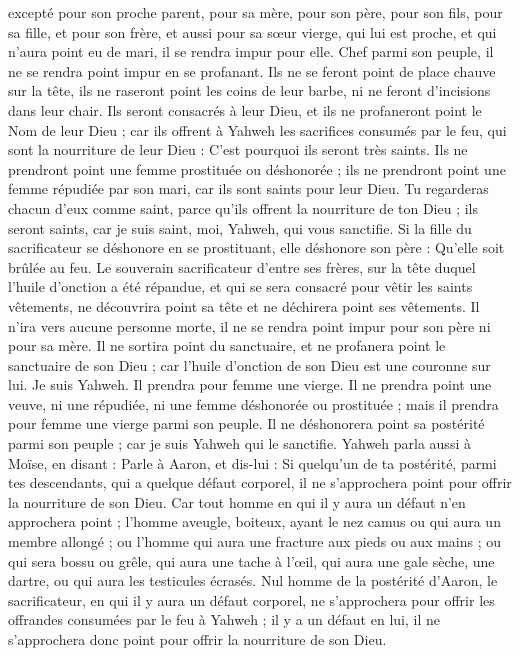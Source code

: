 \begin{multicols}{2}
excepté pour son proche parent, pour sa mère, pour son père, pour son fils, pour sa fille, et pour son frère,
et aussi pour sa sœur vierge, qui lui est proche, et qui n'aura point eu de mari, il se rendra impur pour elle.
Chef parmi son peuple, il ne se rendra point impur en se profanant.
Ils ne se feront point de place chauve sur la tête, ils ne raseront point les coins de leur barbe, ni ne feront d'incisions dans leur chair.
Ils seront consacrés à leur Dieu, et ils ne profaneront point le Nom de leur Dieu ; car ils offrent à Yahweh les sacrifices consumés par le feu, qui sont la nourriture de leur Dieu : C'est pourquoi ils seront très saints.
Ils ne prendront point une femme prostituée ou déshonorée ; ils ne prendront point une femme répudiée par son mari, car ils sont saints pour leur Dieu.
Tu regarderas chacun d'eux comme saint, parce qu'ils offrent la nourriture de ton Dieu ; ils seront saints, car je suis saint, moi, Yahweh, qui vous sanctifie.
Si la fille du sacrificateur se déshonore en se prostituant, elle déshonore son père : Qu'elle soit brûlée au feu.
Le souverain sacrificateur d’entre ses frères, sur la tête duquel l'huile d'onction a été répandue, et qui se sera consacré pour vêtir les saints vêtements, ne découvrira point sa tête et ne déchirera point ses vêtements.
Il n'ira vers aucune personne morte, il ne se rendra point impur pour son père ni pour sa mère.
Il ne sortira point du sanctuaire, et ne profanera point le sanctuaire de son Dieu ; car l'huile d'onction de son Dieu est une couronne sur lui. Je suis Yahweh.
Il prendra pour femme une vierge.
Il ne prendra point une veuve, ni une répudiée, ni une femme déshonorée ou prostituée ; mais il prendra pour femme une vierge parmi son peuple.
Il ne déshonorera point sa postérité parmi son peuple ; car je suis Yahweh qui le sanctifie.
Yahweh parla aussi à Moïse, en disant :
Parle à Aaron, et dis-lui : Si quelqu'un de ta postérité, parmi tes descendants, qui a quelque défaut corporel, il ne s'approchera point pour offrir la nourriture de son Dieu.
Car tout homme en qui il y aura un défaut n'en approchera point ; l'homme aveugle, boiteux, ayant le nez camus ou qui aura un membre allongé ;
ou l'homme qui aura une fracture aux pieds ou aux mains ;
ou qui sera bossu ou grêle, qui aura une tache à l'œil, qui aura une gale sèche, une dartre, ou qui aura les testicules écrasés.
Nul homme de la postérité d'Aaron, le sacrificateur, en qui il y aura un défaut corporel, ne s'approchera pour offrir les offrandes consumées par le feu à Yahweh ; il y a un défaut en lui, il ne s'approchera donc point pour offrir la nourriture de son Dieu.

\end{multicols}
